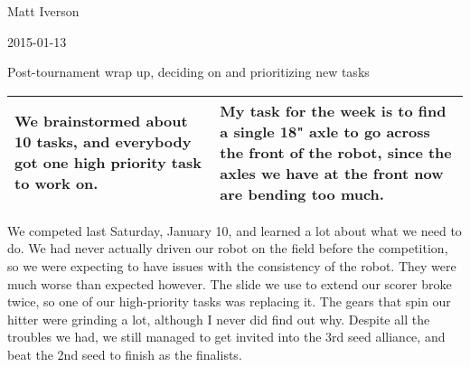 Matt Iverson

2015-01-13

Post-tournament wrap up, deciding on and prioritizing new tasks

\begin{tabular}{|p{5cm}|p{5cm}|}
 \hline
 We brainstormed about 10 tasks, and everybody got one high priority task to work on.
&
 My task for the week is to find a single 18" axle to go across the front of the robot, since the axles we have at the front now are bending too much.
\\
 \hline
\end{tabular}

We competed last Saturday, January 10, and learned a lot about what we need to do. We had never actually driven our robot on the field before the competition, so we were expecting to have issues with the consistency of the robot. They were much worse than expected however. The slide we use to extend our scorer broke twice, so one of our high-priority tasks was replacing it. The gears that spin our hitter were grinding a lot, although I never did find out why. Despite all the troubles we had, we still managed to get invited into the 3rd seed alliance, and beat the 2nd seed to finish as the finalists.

